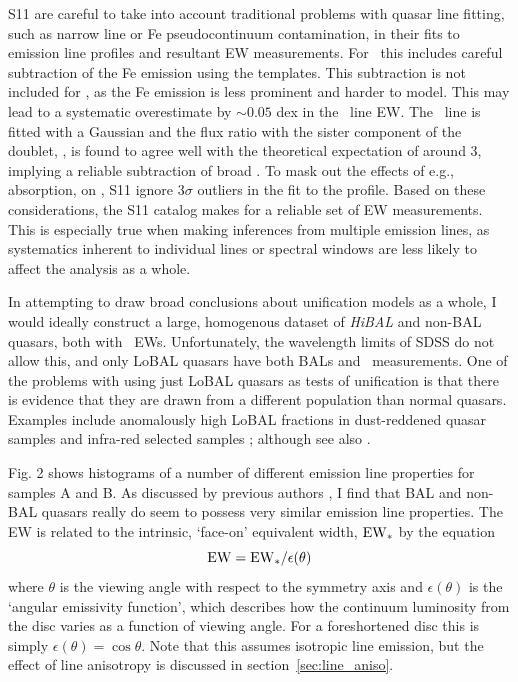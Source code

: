 S11 are careful to take into account traditional problems with quasar line fitting,
such as narrow line or Fe pseudocontinuum contamination, in their fits to 
emission line profiles and resultant EW measurements. For \mgline\
this includes careful subtraction of the Fe emission using the \cite{vestergaard2001}
templates. This subtraction is not included for \civfull,
as the Fe emission is less prominent and harder to model. This may lead to
a systematic overestimate by $\sim0.05$ dex in the \civ\ line EW. 
The \oiiifull\ line is fitted
with a Gaussian and the flux ratio with the sister component 
of the doublet, \oiiidoublet, is found to agree well with the theoretical
expectation of around 3, implying a reliable subtraction of broad \hb.
To mask out the effects of e.g., absorption, on \civ, S11 ignore 
$3\sigma$ outliers in the fit to the profile. Based on these
considerations, the S11 catalog makes for a reliable set of EW 
measurements. This is especially true when making inferences from 
multiple emission lines, as systematics inherent to individual lines 
or spectral windows are less likely to affect the analysis as a whole.

In attempting to draw broad conclusions about unification models as a whole,
I would ideally construct a large, homogenous dataset of 
{\em HiBAL} and non-BAL quasars, both with \oiiifull\ EWs. Unfortunately,
the wavelength limits of SDSS do not allow this, and only LoBAL quasars have 
both BALs and \ewo\ measurements. One of the problems with
using just LoBAL quasars as tests of unification is that there is evidence 
that they are drawn from a different population than normal quasars. 
Examples include anomalously 
high LoBAL fractions in dust-reddened quasar samples \citep{urrutia2009} 
and infra-red selected samples \citep{dai2012}; 
although see also \cite{lazarova2012}.


Fig. 2 shows histograms of a number of different 
emission line properties for samples A and B. 
As discussed by previous authors \cite[e.g.][]{weymann1991}, I find that BAL
and non-BAL quasars really do seem to possess very similar emission line 
properties. The EW is related to the intrinsic, `face-on' equivalent width,
${\rm EW}_*$ by the equation
\begin{equation}
{\rm EW} = {\rm EW}_* /\epsilon(\theta)
\end{equation}
where $\theta$ is the viewing angle with respect to the symmetry axis 
and $\epsilon(\theta)$ is the `angular emissivity function', which describes 
how the continuum luminosity from the disc varies as a function of viewing angle.
For a foreshortened disc this is simply $\epsilon(\theta) = \cos \theta$. 
Note that this assumes isotropic line emission, but the effect of line
anisotropy is discussed in section~\ref{sec:line_aniso}.

